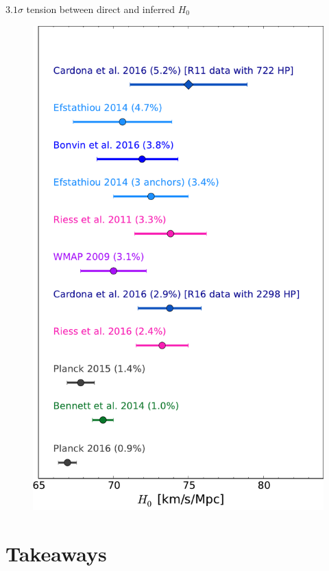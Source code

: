 \documentclass{beamer}
\begin{document}
\begin{frame}{$3.1\sigma$ tension between direct and inferred $H_0$}
\begin{figure}
\includegraphics[scale=0.3]{../figures/chapter-h0/H0_best_estimates.pdf} 
\end{figure}
\end{frame}


\section{Takeaways}
\end{document}
